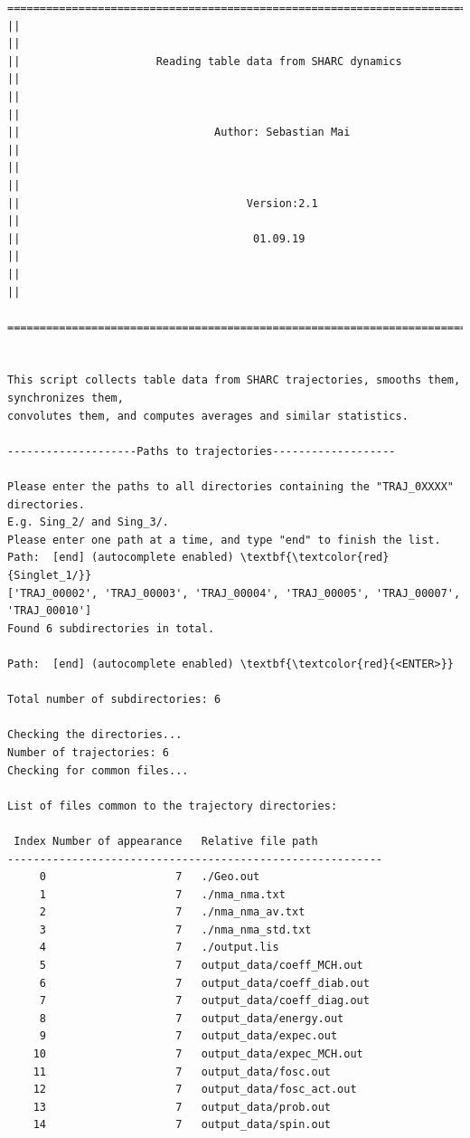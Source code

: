 \documentclass[a4paper,11pt,DIV=15,openany]{scrbook}
\begin{document}
\begin{oframed}
\footnotesize\begin{Verbatim}[commandchars=\\\{\}]
  ================================================================================
||                                                                                ||
||                     Reading table data from SHARC dynamics                     ||
||                                                                                ||
||                              Author: Sebastian Mai                             ||
||                                                                                ||
||                                   Version:2.1                                  ||
||                                    01.09.19                                    ||
||                                                                                ||
  ================================================================================


This script collects table data from SHARC trajectories, smooths them, synchronizes them,
convolutes them, and computes averages and similar statistics.
  
--------------------Paths to trajectories-------------------

Please enter the paths to all directories containing the "TRAJ_0XXXX" directories.
E.g. Sing_2/ and Sing_3/. 
Please enter one path at a time, and type "end" to finish the list.
Path:  [end] (autocomplete enabled) \textbf{\textcolor{red}{Singlet_1/}}
['TRAJ_00002', 'TRAJ_00003', 'TRAJ_00004', 'TRAJ_00005', 'TRAJ_00007', 'TRAJ_00010']
Found 6 subdirectories in total.

Path:  [end] (autocomplete enabled) \textbf{\textcolor{red}{<ENTER>}}

Total number of subdirectories: 6

Checking the directories...
Number of trajectories: 6
Checking for common files...

List of files common to the trajectory directories:

 Index Number of appearance   Relative file path
----------------------------------------------------------
     0                    7   ./Geo.out
     1                    7   ./nma_nma.txt
     2                    7   ./nma_nma_av.txt
     3                    7   ./nma_nma_std.txt
     4                    7   ./output.lis
     5                    7   output_data/coeff_MCH.out
     6                    7   output_data/coeff_diab.out
     7                    7   output_data/coeff_diag.out
     8                    7   output_data/energy.out
     9                    7   output_data/expec.out
    10                    7   output_data/expec_MCH.out
    11                    7   output_data/fosc.out
    12                    7   output_data/fosc_act.out
    13                    7   output_data/prob.out
    14                    7   output_data/spin.out


\end{Verbatim}
\end{oframed}
\end{document}
